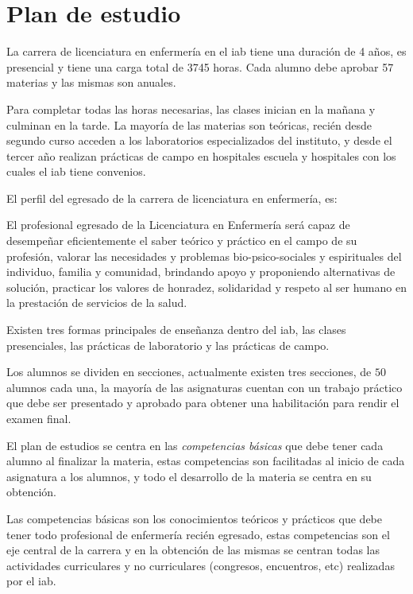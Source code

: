 \section{Plan de estudio}
\label{sec:plan_estudio}

La carrera de licenciatura en enfermería en el \Gls{iab} tiene una duración de 4
años, es presencial y tiene una carga total de 3745 horas. Cada alumno debe
aprobar 57 materias y las mismas son anuales.

Para completar todas las horas necesarias, las clases inician en la mañana y
culminan en la tarde. La mayoría de las materias son teóricas, recién desde
segundo curso acceden a los laboratorios especializados del instituto, y desde
el tercer año realizan prácticas de campo en hospitales escuela y hospitales con
los cuales el \Gls{iab} tiene convenios.

El perfil del egresado de la carrera de licenciatura en enfermería,
es\cite{iab:enfermeria}:

\begin{displayquote}

El profesional egresado de la Licenciatura en Enfermería será capaz de
desempeñar eficientemente el saber teórico y práctico en el campo de su
profesión, valorar las necesidades y problemas bio-psico-sociales y espirituales
del individuo, familia y comunidad, brindando apoyo y proponiendo alternativas
de solución, practicar los valores de honradez, solidaridad y respeto al ser
humano en la prestación de servicios de la salud.

\end{displayquote}

Existen tres formas principales de enseñanza dentro del \Gls{iab}, las clases
presenciales, las prácticas de laboratorio y las prácticas de campo.

Los alumnos se dividen en secciones, actualmente existen tres secciones, de $50$
alumnos cada una, la mayoría de las asignaturas cuentan con un trabajo práctico
que debe ser presentado y aprobado para obtener una habilitación para rendir el
examen final.

El plan de estudios se centra en las \emph{competencias básicas} que debe tener
cada alumno al finalizar la materia, estas competencias son facilitadas al
inicio de cada asignatura a los alumnos, y todo el desarrollo de la materia se
centra en su obtención.

Las competencias básicas son los conocimientos teóricos y prácticos que debe
tener todo profesional de enfermería recién egresado, estas competencias son el
eje central de la carrera y en la obtención de las mismas se centran todas las
actividades curriculares y no curriculares (congresos, encuentros, etc)
realizadas por el \Gls{iab}.
